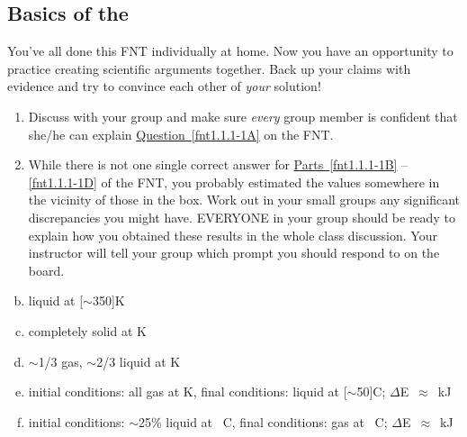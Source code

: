 \subsection{Basics of the \ThreePhaseModel{}}

\begin{fnt}
	
\end{fnt}

\noindent
You've all done this FNT individually at home. Now you have an opportunity to practice creating scientific arguments together. Back up your claims with evidence and try to convince each other of \emph{your} solution!

\begin{enumerate}
	\item Discuss with your group and make sure \emph{every} group member is confident that she/he can explain \hyperref[fnt1.1.1-1A]{Question~\ref*{fnt1.1.1-1A}} on the FNT.
	
	\item While there is not one single correct answer for \hyperref[fnt1.1.1-1B]{Parts~\ref*{fnt1.1.1-1B}} -- \hyperref[fnt1.1.1-1D]{\ref*{fnt1.1.1-1D}} of the FNT, you probably estimated the values somewhere in the vicinity of those in the box. Work out in your small groups any significant discrepancies you might have. EVERYONE in your group should be ready to explain how you obtained these results in the whole class discussion. Your instructor will tell your group which prompt you should respond to on the board.
\end{enumerate}

\begin{ans}
	\begin{enumerate}[(a)]
	  \setcounter{enumi}{1}
		\item liquid at \unit[$\sim$350]{K}
		\item completely solid at \unit[273]{K}
		\item $\sim$1/3 gas, $\sim$2/3 liquid at \unit[373]{K}
		\item initial conditions: all gas at \unit[373]{K}, final conditions: liquid at \unit[$\sim$50]{\textdegree C}; $\Delta$E~$\approx$~\unit[2470]{kJ}
		\item initial conditions: $\sim$25\% liquid at \unit[0]{\textdegree C}, final conditions: gas at \unit[100]{\textdegree C}; $\Delta$E~$\approx$~\unit[3000]{kJ}
	\end{enumerate}
\end{ans}


